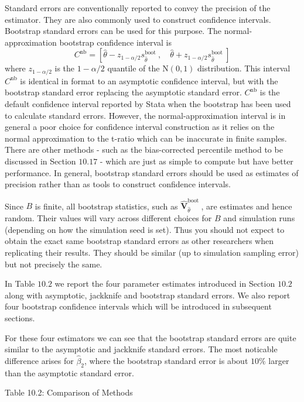 \documentclass[10pt]{article}
\begin{document}
Standard errors are conventionally reported to convey the precision of the estimator. They are also commonly used to construct confidence intervals. Bootstrap standard errors can be used for this purpose. The normal-approximation bootstrap confidence interval is
$$
C^{\mathrm{nb}}=\left[\widehat{\theta}-z_{1-\alpha / 2} s_{\widehat{\theta}}^{\text {boot }}, \quad \widehat{\theta}+z_{1-\alpha / 2} s_{\widehat{\theta}}^{\text {boot }}\right]
$$
where $z_{1-\alpha / 2}$ is the $1-\alpha / 2$ quantile of the $\mathrm{N}(0,1)$ distribution. This interval $C^{\mathrm{nb}}$ is identical in format to an asymptotic confidence interval, but with the bootstrap standard error replacing the asymptotic standard error. $C^{\mathrm{nb}}$ is the default confidence interval reported by Stata when the bootstrap has been used to calculate standard errors. However, the normal-approximation interval is in general a poor choice for confidence interval construction as it relies on the normal approximation to the t-ratio which can be inaccurate in finite samples. There are other methods - such as the bias-corrected percentile method to be discussed in Section $10.17$ - which are just as simple to compute but have better performance. In general, bootstrap standard errors should be used as estimates of precision rather than as tools to construct confidence intervals.

Since $B$ is finite, all bootstrap statistics, such as $\widehat{\boldsymbol{V}}_{\widehat{\theta}}^{\text {boot }}$, are estimates and hence random. Their values will vary across different choices for $B$ and simulation runs (depending on how the simulation seed is set). Thus you should not expect to obtain the exact same bootstrap standard errors as other researchers when replicating their results. They should be similar (up to simulation sampling error) but not precisely the same.

In Table $10.2$ we report the four parameter estimates introduced in Section $10.2$ along with asymptotic, jackknife and bootstrap standard errors. We also report four bootstrap confidence intervals which will be introduced in subsequent sections.

For these four estimators we can see that the bootstrap standard errors are quite similar to the asymptotic and jackknife standard errors. The most noticable difference arises for $\widehat{\beta}_{2}$, where the bootstrap standard error is about $10 \%$ larger than the asymptotic standard error.

Table 10.2: Comparison of Methods
\end{document}
